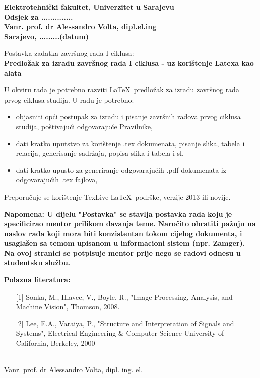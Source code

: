 \thispagestyle{plain}
\begin{flushleft}
\textbf{Elektrotehnički fakultet, Univerzitet u Sarajevu}\\
\textbf{Odsjek za ..............}\\
\textbf{Vanr. prof. dr Alessandro Volta, dipl.el.ing}\\


\textbf{Sarajevo, .........(datum) }\\
\end{flushleft}

\begin{center}
\vspace{2cm}
{\Large Postavka zadatka završnog rada I ciklusa:}\\
\vspace{0.2cm}
{\large \textbf{Predložak za izradu završnog rada I ciklusa - uz korištenje Latexa kao alata}}
\end{center}

\vspace{0.5cm}
U okviru rada je potrebno razviti \LaTeX\ predložak za izradu završnog rada prvog ciklusa studija. U radu je potrebno:
\begin{itemize}
\item objasniti opći postupak za izradu i pisanje završnih radova prvog ciklusa studija, poštivajući odgovarajuće Pravilnike,
\item dati kratko uputstvo za korištenje .tex dokumenata, pisanje slika, tabela i relacija, generisanje sadržaja, popisa slika i tabela i sl.
\item dati kratko upusto za generiranje odgovarajućih .pdf dokumenata iz odgovarajućih .tex fajlova,
\end{itemize}
Preporučuje se korištenje TexLive \LaTeX\ podrške, verzije 2013 ili novije.

\textbf{Napomena: U dijelu "Postavka" se stavlja postavka rada koju je specificirao mentor prilikom davanja teme. Naročito obratiti pažnju na naslov rada koji mora biti konzistentan tokom cijelog dokumenta, i usaglašen sa temom upisanom u informacioni sistem (npr. Zamger). Na ovoj stranici se potpisuje mentor prije nego se radovi odnesu u studentsku službu.}


\vspace{1cm}
\textbf{Polazna literatura:}

\begin{itemize}
\item[]  [1] Sonka, M., Hlavec, V., Boyle, R., "Image Processing, Analysis, and Machine Vision", Thomson, 2008.
\item[] [2] Lee, E.A., Varaiya, P., "Structure and Interpretation of Signals and Systems", Electrical Engineering \& Computer Science University of California, Berkeley, 2000

\end{itemize}


\begin{center}
\vspace{2cm}
\makebox[8cm]{\hrulefill} \\
Vanr. prof. dr Alessandro Volta, dipl. ing. el.\\
\end{center}





